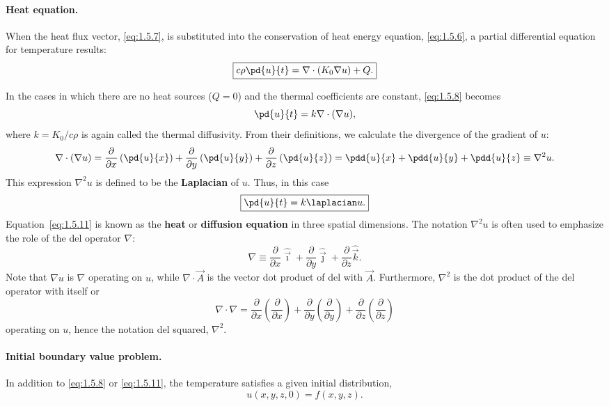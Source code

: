 \paragraph{Heat equation.}
When the heat flux vector, \eqref{eq:1.5.7}, is substituted into the conservation of heat energy equation, \eqref{eq:1.5.6}, a partial differential equation for temperature results:
\begin{equation}
\boxed{c\rho\pd{u}{t} = \nabla\cdot(K_0\nabla u) + Q.}
\label{eq:1.5.8}
\end{equation}

In the cases in which there are no heat sources ($Q = 0$) and the thermal coefficients are constant, \eqref{eq:1.5.8} becomes
\begin{equation}
\pd{u}{t} = k\nabla\cdot(\nabla u),
\label{eq:1.5.9}
\end{equation}
where $k = K_0/c\rho$ is again called the thermal diffusivity. From their definitions, we calculate the divergence of the gradient of $u$:
\begin{equation}
\nabla\cdot(\nabla u) = \frac{\partial}{\partial x}\left(\pd{u}{x}\right) + \frac{\partial}{\partial y}\left(\pd{u}{y}\right) + \frac{\partial}{\partial z}\left(\pd{u}{z}\right) = \pdd{u}{x} + \pdd{u}{y} + \pdd{u}{z} \equiv \nabla^2 u.
\label{eq:1.5.10}
\end{equation}
This expression $\nabla^2 u$ is defined to be the \textbf{Laplacian} of $u$. Thus, in this case
\begin{equation}
\boxed{\pd{u}{t} = k\laplacian u.}
\label{eq:1.5.11}
\end{equation}
Equation~\eqref{eq:1.5.11} is known as the \textbf{heat} or \textbf{diffusion equation} in three spatial dimensions. The notation $\nabla^2 u$ is often used to emphasize the role of the del operator $\nabla$:
\[
\nabla \equiv \frac{\partial}{\partial x}\hat{\vec{\imath}} + \frac{\partial}{\partial y}\hat{\vec{\jmath}} + \frac{\partial}{\partial z}\hat{\vec{k}}.
\]
Note that $\nabla u$ is $\nabla$ operating on $u$, while $\nabla\cdot\vec{A}$ is the vector dot product of del with $\vec{A}$. Furthermore, $\nabla^2$ is the dot product of the del operator with itself or
\[
\nabla\cdot\nabla = \frac{\partial}{\partial x}\left(\frac{\partial}{\partial x}\right) + \frac{\partial}{\partial y}\left(\frac{\partial}{\partial y}\right) + \frac{\partial}{\partial z}\left(\frac{\partial}{\partial z}\right)
\]
operating on $u$, hence the notation del squared, $\nabla^2$.

\paragraph{Initial boundary value problem.}
In addition to \eqref{eq:1.5.8} or \eqref{eq:1.5.11}, the temperature satisfies a given initial distribution,
\[
u(x,y,z,0) = f(x,y,z).
\]

